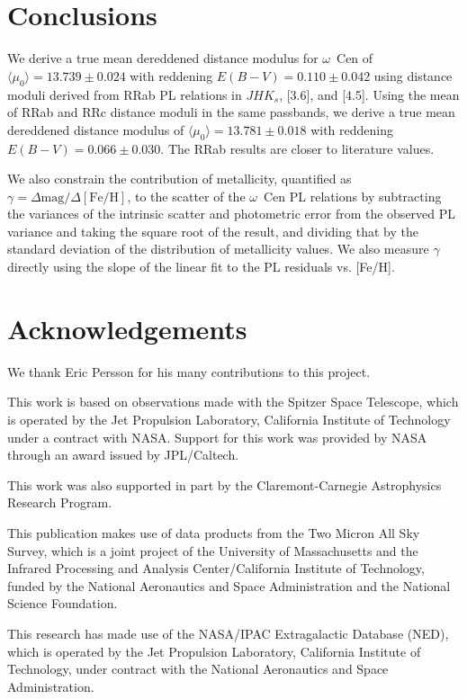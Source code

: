 \documentclass[a4paper,fleqn,usenatbib]{mnras}
\begin{document}
\section{Conclusions}
\label{sec:conclusions}

We derive a true mean dereddened distance modulus for $\omega$~Cen of $\langle \mu_0 \rangle = 13.739 \pm 0.024$ with reddening $E(B-V) = 0.110 \pm 0.042$ using distance moduli derived from RRab PL relations in $JHK_s$, [3.6], and [4.5]. Using the mean of RRab and RRc distance moduli in the same passbands, we derive a true mean dereddened distance modulus of $\langle \mu_0 \rangle = 13.781 \pm 0.018$ with reddening $E(B-V) = 0.066 \pm 0.030$. The RRab results are closer to literature values.

We also constrain the contribution of metallicity, quantified as $\gamma = \Delta \text{mag} / \Delta [\text{Fe/H}]$, to the scatter of the $\omega$~Cen PL relations by subtracting the variances of the intrinsic scatter and photometric error from the observed PL variance and taking the square root of the result, and dividing that by the standard deviation of the distribution of metallicity values. We also measure $\gamma$ directly using the slope of the linear fit to the PL residuals vs. [Fe/H].


\section*{Acknowledgements}
\label{sec:acknowledgements}

We thank Eric Persson for his many contributions to this project.

This work is based on observations made with the Spitzer Space Telescope, which is operated by the Jet Propulsion Laboratory, California Institute of Technology under a contract with NASA. Support for this work was provided by NASA through an award issued by JPL/Caltech.

This work was also supported in part by the Claremont-Carnegie Astrophysics Research Program.

This publication makes use of data products from the Two Micron All Sky Survey, which is a joint project of the University of Massachusetts and the Infrared Processing and Analysis Center/California Institute of Technology, funded by the National Aeronautics and Space Administration and the National Science Foundation.

This research has made use of the NASA/IPAC Extragalactic Database (NED), which is operated by the Jet Propulsion Laboratory, California Institute of Technology, under contract with the National Aeronautics and Space Administration.
\end{document}

